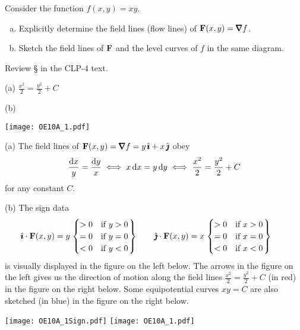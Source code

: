 \begin{question}[M317 2010A] %
Consider the function $f(x,y) = xy$.
\begin{enumerate}[(a)]
\item
Explicitly determine the field lines (flow lines) of 
$\vF(x,y) = \vnabla f$.
\item
Sketch the field lines of $\mathbf{F}$ and the level curves of $f$ in the same diagram.
\end{enumerate}
\end{question}

\begin{hint} 
Review \S{} in the CLP-4 text.
\end{hint}

\begin{answer} 
(a) $\frac{x^2}{2} =\frac{y^2}{2} +C$

(b) 
  \begin{center}
       \texttt{[image: OE10A\_1.pdf]}
  \end{center}

\end{answer}

\begin{solution} (a) The field lines of $\vF(x,y) = \vnabla f
=y\,\hi + x\,\hj$ obey
\begin{align*}
\frac{\mathrm{d}x}{y} = \frac{\mathrm{d}y}{x}
\iff x\,\mathrm{d}x = y\,\mathrm{d}y
\iff \frac{x^2}{2} =\frac{y^2}{2} +C
\end{align*}
for any constant $C$.

\noindent (b)
The sign data
\begin{align*}
\hat{\pmb{\imath}}\cdot\mathbf{F}(x,y) = y
    \left.\begin{cases}
             >0 &\text{if $y>0$} \\
             =0 &\text{if $y=0$} \\
             <0 &\text{if $y<0$} 
       \end{cases}\right\}\qquad
\hat{\pmb{\jmath}}\cdot\mathbf{F}(x,y) = x
    \left.\begin{cases}
             >0 &\text{if $x>0$} \\
             =0 &\text{if $x=0$} \\
             <0 &\text{if $x<0$} 
       \end{cases}\right\}\qquad
\end{align*}
is visually displayed in the figure on the left below. The arrows in the
figure on the left gives us the direction of motion along 
the field lines $\frac{x^2}{2} =\frac{y^2}{2} +C$ (in red) in the 
figure on the right below. Some equipotential curves $xy=C$ are 
also sketched (in blue) in the figure on the right below.

  \begin{center}
       \texttt{[image: OE10A\_1Sign.pdf]}\qquad\qquad
       \texttt{[image: OE10A\_1.pdf]}
  \end{center}


\end{solution}

